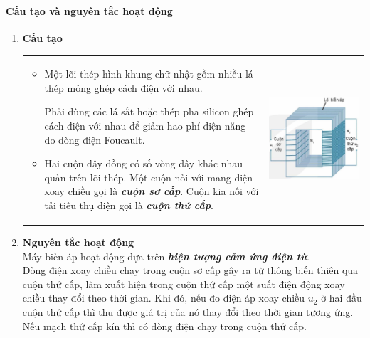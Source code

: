 \begin{tomtat}
	\paragraph{Cấu tạo và nguyên tắc hoạt động}
	\begin{enumerate}[label=\bfseries \alph*)]
		\item \textbf{Cấu tạo}\\
			\begin{tabular}{L{10cm}M{6cm}}
				\begin{itemize}
					\item Một lõi thép hình khung chữ nhật gồm  nhiều lá thép mỏng ghép cách điện với nhau.
					\begin{luuy}
						Phải dùng các lá sắt hoặc thép pha silicon ghép cách điện với nhau để giảm hao phí điện năng do dòng điện Foucault.\end{luuy}
					\item Hai cuộn dây đồng có số vòng dây khác nhau quấn trên lõi thép. Một cuộn nối với mang điện xoay chiều gọi là \textit{\textbf{cuộn sơ cấp}}. Cuộn kia nối với tải tiêu thụ điện gọi là \textit{\textbf{cuộn thứ cấp}}.
				\end{itemize}& \includegraphics[width=0.8\linewidth]{figs/VN12-Y24-PH-SYL-024-1}
				\\
			\end{tabular}
		\item \textbf{Nguyên tắc hoạt động}\\
		Máy biến áp hoạt động dựa trên \textbf{\textit{hiện tượng cảm ứng điện từ}}.\\
		Dòng điện xoay chiều chạy trong cuộn sơ cấp gây ra từ thông biến thiên qua cuộn thứ cấp, làm xuất hiện trong cuộn thứ cấp một suất điện động xoay chiều thay đổi theo thời gian. Khi đó, nếu đo điện áp xoay chiều $u_2$ ở hai đầu cuộn thứ cấp thì thu được giá trị của nó thay đổi theo thời gian tương ứng. Nếu mạch thứ cấp kín thì có dòng điện chạy trong cuộn thứ cấp.
	\end{enumerate}

\end{tomtat}

